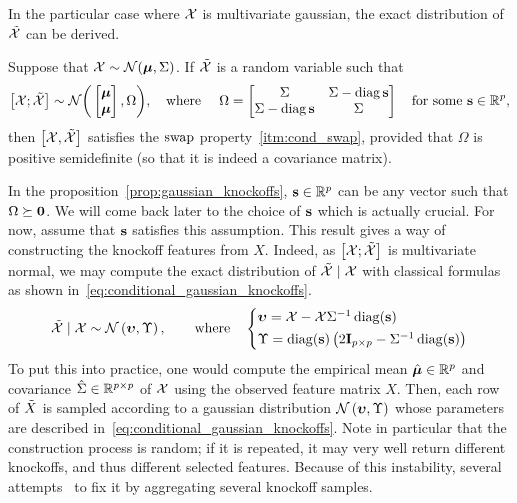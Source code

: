 In the particular case where $\mathcal{X}$ is multivariate gaussian, the exact distribution of $\tilde{\mathcal{X}}$ can be derived.
\begin{proposition}
    Suppose that $\mathcal{X} \sim \mathcal{N}(\bm{\mu}, \Sigma)$.
    If $\tilde{\mathcal{X}}$ is a random variable such that
    \begin{equation*}
        \big[ \mathcal{X}; \tilde{\mathcal{X}} \big] \sim \mathcal{N}\bigg(\begin{bmatrix} \bm{\mu}\\ \bm{\mu} \end{bmatrix}, \Omega\bigg)
        ,\quad\text{where }\quad
        \Omega = \begin{bmatrix}
             \Sigma & \Sigma - \operatorname*{diag} \mathbf{s}\\
             \Sigma - \operatorname*{diag} \mathbf{s} & \Sigma
        \end{bmatrix}
        \quad\text{for some }
        \mathbf{s} \in \mathbb{R}^p,
    \end{equation*}
    then $\big[\mathcal{X}, \tilde{\mathcal{X}} \big]$ satisfies the $\operatorname{swap}$ property~\ref{itm:cond_swap},
    provided that $\Omega$ is positive semidefinite (so that it is indeed a covariance matrix).
\end{proposition}\label{prop:gaussian_knockoffs}
In the proposition~\ref{prop:gaussian_knockoffs},
$\mathbf{s} \in \mathbb{R}^p$ can be any vector such that $\Omega \succeq \mathbf{0}$.
We will come back later to the choice of $\mathbf{s}$ which is actually crucial.
For now, assume that $\mathbf{s}$ satisfies this assumption.
This result gives a way of constructing the knockoff features from $X$.
Indeed, as $\big[ \mathcal{X}; \tilde{\mathcal{X}} \big]$ is multivariate normal, we may compute the exact distribution of
$\tilde{\mathcal{X}} \mid \mathcal{X}$ with classical formulas~\cite{conditional_normal} as shown in~\ref{eq:conditional_gaussian_knockoffs}.
\begin{equation}\label{eq:conditional_gaussian_knockoffs}
    \tcX \mid \cX \sim \cN\left( \bupsilon, \Upsilon \right)
    ,\qquad\text{where}\quad
    \begin{cases*}
        \bupsilon = \cX - \cX\Sigma^{-1}\diag(\bs)\\
        \Upsilon = \diag(\bs)\left( 2\mI_{p \times p} - \Sigma^{-1}\diag(\bs) \right)
    \end{cases*}
\end{equation}
To put this into practice, one would compute the empirical mean
$\hat{\bm{\mu}} \in \mathbb{R}^p$ and covariance $\hat{\Sigma} \in \mathbb{R}^{p \times p}$ of $\mathcal{X}$
using the observed feature matrix $X$.
Then, each row of $\tilde{X}$ is sampled according to a gaussian distribution $\mathcal{N}\left( \bm{\upsilon}, \Upsilon \right)$
whose parameters are described in~\ref{eq:conditional_gaussian_knockoffs}.
Note in particular that the construction process is random;
if it is repeated, it may very well return different knockoffs, and thus different
selected features.
Because of this instability, several attempts~\cite{improve_stability_knockoffs} to fix it by
aggregating several knockoff samples.

